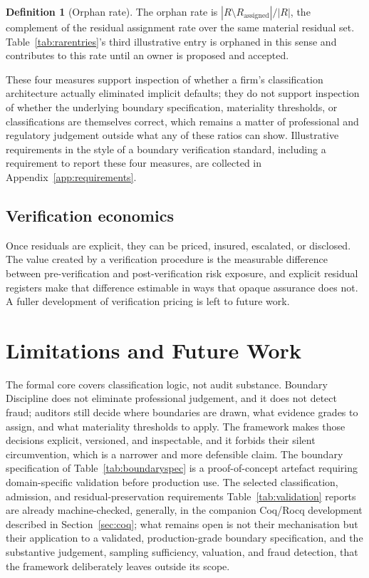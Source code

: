 \documentclass[11pt,a4paper]{article}
\theoremstyle{definition}
\newtheorem{definition}{Definition}[section]
\theoremstyle{remark}
\begin{document}
\begin{definition}[Orphan rate]
\label{def:orphanrate}
The orphan rate is $|R \setminus R_{\mathrm{assigned}}| / |R|$, the complement of the residual assignment rate over the same material residual set. Table~\ref{tab:rarentries}'s third illustrative entry is orphaned in this sense and contributes to this rate until an owner is proposed and accepted.
\end{definition}

These four measures support inspection of whether a firm's classification architecture actually eliminated implicit defaults; they do not support inspection of whether the underlying boundary specification, materiality thresholds, or classifications are themselves correct, which remains a matter of professional and regulatory judgement outside what any of these ratios can show. Illustrative requirements in the style of a boundary verification standard, including a requirement to report these four measures, are collected in Appendix~\ref{app:requirements}.

\subsection*{Verification economics}

Once residuals are explicit, they can be priced, insured, escalated, or disclosed. The value created by a verification procedure is the measurable difference between pre-verification and post-verification risk exposure, and explicit residual registers make that difference estimable in ways that opaque assurance does not. A fuller development of verification pricing is left to future work.

\section{Limitations and Future Work}
\label{sec:limitations}

The formal core covers classification logic, not audit substance. Boundary Discipline does not eliminate professional judgement, and it does not detect fraud; auditors still decide where boundaries are drawn, what evidence grades to assign, and what materiality thresholds to apply. The framework makes those decisions explicit, versioned, and inspectable, and it forbids their silent circumvention, which is a narrower and more defensible claim. The boundary specification of Table~\ref{tab:boundaryspec} is a proof-of-concept artefact requiring domain-specific validation before production use. The selected classification, admission, and residual-preservation requirements Table~\ref{tab:validation} reports are already machine-checked, generally, in the companion Coq/Rocq development described in Section~\ref{sec:coq}; what remains open is not their mechanisation but their application to a validated, production-grade boundary specification, and the substantive judgement, sampling sufficiency, valuation, and fraud detection, that the framework deliberately leaves outside its scope.
\end{document}
